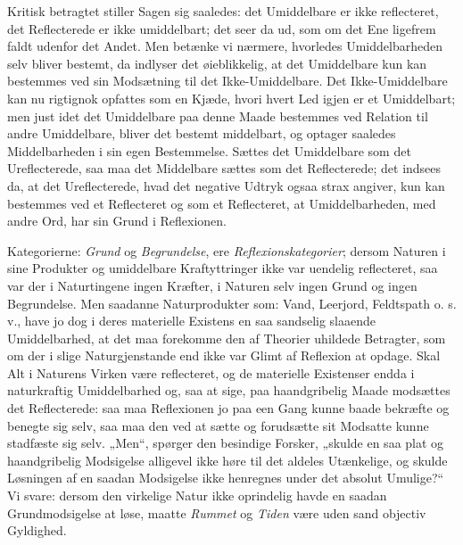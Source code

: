 \documentclass[12pt,a4paper]{book}
\begin{document}
Kritisk betragtet stiller Sagen sig saaledes: det
Umiddelbare er ikke reflecteret, det Reflecterede er ikke umiddelbart;
det seer da ud, som om det Ene ligefrem faldt udenfor det
Andet. Men betænke vi nærmere, hvorledes Umiddelbarheden
selv bliver bestemt, da indlyser det øieblikkelig, at det
Umiddelbare kun kan bestemmes ved sin Modsætning til det
Ikke-Umiddelbare. Det Ikke-Umiddelbare kan nu rigtignok
opfattes som en Kjæde, hvori hvert Led igjen er et
Umiddelbart; men just idet det Umiddelbare paa denne Maade
bestemmes ved Relation til andre Umiddelbare, bliver det bestemt
middelbart, og optager saaledes Middelbarheden i sin egen
Bestemmelse. Sættes det Umiddelbare som det Ureflecterede,
saa maa det Middelbare sættes som det Reflecterede; det
indsees da, at det Ureflecterede, hvad det negative Udtryk
ogsaa strax angiver, kun kan bestemmes ved et Reflecteret og
som et Reflecteret, at Umiddelbarheden, med andre Ord, har
sin Grund i Reflexionen.

Kategorierne: \emph{Grund} og \emph{Begrundelse}, ere
\emph{Reflexionskategorier}; dersom Naturen i sine Produkter og
umiddelbare Kraftyttringer ikke var uendelig reflecteret, saa var der i
Naturtingene ingen Kræfter, i Naturen selv ingen Grund og
ingen Begrundelse. Men saadanne Naturprodukter som:
Vand, Leerjord, Feldtspath o. s. v., have jo dog i deres
materielle Existens en saa sandselig slaaende Umiddelbarhed, at
det maa forekomme den af Theorier uhildede Betragter, som
om der i slige Naturgjenstande end ikke var Glimt af
Reflexion at opdage. Skal Alt i Naturens Virken være
reflecteret, og de materielle Existenser endda i naturkraftig
Umiddelbarhed og, saa at sige, paa haandgribelig Maade modsættes
det Reflecterede: saa maa Reflexionen jo paa een Gang
kunne baade bekræfte og benegte sig selv, saa maa den ved at
sætte og forudsætte sit Modsatte kunne stadfæste sig selv.
„Men“, spørger den besindige Forsker, „skulde en saa plat
og haandgribelig Modsigelse alligevel ikke høre til det aldeles
Utænkelige, og skulde Løsningen af en saadan Modsigelse ikke
henregnes under det absolut Umulige?“ Vi svare: dersom den
virkelige Natur ikke oprindelig havde en saadan
Grundmodsigelse at løse, maatte \emph{Rummet} og \emph{Tiden} være uden sand
objectiv Gyldighed.
\end{document}
